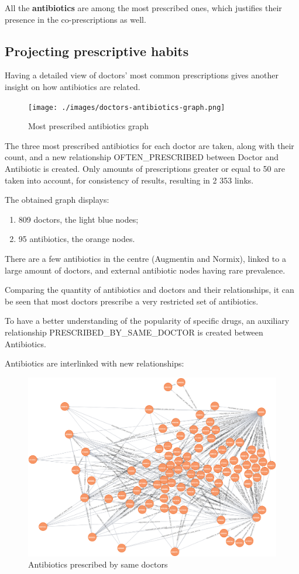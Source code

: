 All the \textbf{antibiotics} are among the most prescribed ones, which justifies their presence in the co-prescriptions as well.

\subsection{Projecting prescriptive habits}
Having a detailed view of doctors' most common prescriptions gives another insight on how antibiotics are related.

\begin{figure}[h]
	\centering
	\texttt{[image: ./images/doctors-antibiotics-graph.png]}
	\caption{\small Most prescribed antibiotics graph}
\end{figure}

The three most prescribed antibiotics for each doctor are taken, along with their count, and a new relationship OFTEN\_PRESCRIBED between Doctor and Antibiotic is created. Only amounts of prescriptions greater or equal to 50 are taken into account, for consistency of results, resulting in 2 353 links.

The obtained graph displays:
\begin{enumerate}
	\item 809 doctors, the light blue nodes;
	\item 95 antibiotics, the orange nodes.
\end{enumerate}

There are a few antibiotics in the centre (Augmentin and Normix), linked to a large amount of doctors, and external antibiotic nodes having rare prevalence.

Comparing the quantity of antibiotics and doctors and their relationships, it can be seen that most doctors prescribe a very restricted set of antibiotics. 

To have a better understanding of the popularity of specific drugs, an auxiliary relationship PRESCRIBED\_BY\_SAME\_DOCTOR is created between Antibiotics. 

\newpage
Antibiotics are interlinked with new relationships:

\begin{figure}[h]
	\centering
	\includegraphics[scale=0.3]{./images/antibiotics-graph.png}
	\caption{\small Antibiotics prescribed by same doctors}
\end{figure}

